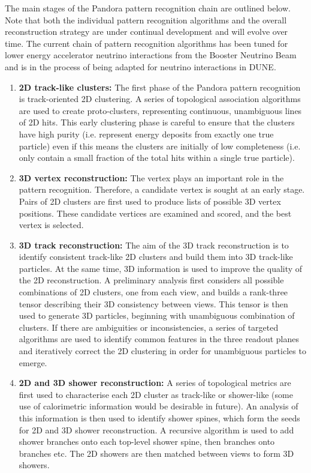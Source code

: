 The main stages of the Pandora pattern recognition chain are outlined below. Note that both the individual pattern recognition algorithms and the overall reconstruction strategy are under continual development and will evolve over time. The current chain of pattern recognition algorithms has been tuned for lower energy accelerator neutrino interactions from the Booster Neutrino Beam and is in the process of being adapted for neutrino interactions in DUNE.


\begin{enumerate}
\item{\bf 2D track-like clusters:}  The first phase of the Pandora pattern recognition is track-oriented 2D clustering. A series of topological association algorithms are used to create proto-clusters, representing continuous, unambiguous lines of 2D hits. This early clustering phase is careful to ensure that the clusters have high purity (i.e. represent energy deposits from exactly one true particle) even if this means the clusters are initially of low completeness (i.e. only contain a small fraction of the total hits within a single true particle).
\item{\bf 3D vertex reconstruction:} The vertex plays an important role in the pattern recognition. Therefore, a candidate vertex is sought at an early stage. Pairs of 2D clusters are first used to produce lists of possible 3D vertex positions. These candidate vertices are examined and scored, and the best vertex is selected.
\item{\bf 3D track reconstruction:} The aim of the 3D track reconstruction is to identify consistent track-like 2D clusters and build them into 3D track-like particles. At the same time, 3D information is used to improve the quality of the 2D reconstruction. A preliminary analysis first considers all possible combinations of 2D clusters, one from each view, and builds a rank-three tensor describing their 3D consistency between views. This tensor is then used to generate 3D particles, beginning with unambiguous combination of clusters. If there are ambiguities or inconsistencies, a series of targeted algorithms are used to identify common features in the three readout planes and iteratively correct the 2D clustering in order for unambiguous particles to emerge.
\item{\bf 2D and 3D shower reconstruction:} A series of topological metrics are first used to characterise each 2D cluster as track-like or shower-like (some use of calorimetric information would be desirable in future). An analysis of this information is then used to identify shower spines, which form the seeds for 2D and 3D shower reconstruction. A recursive algorithm is used to add shower branches onto each top-level shower spine, then branches onto branches etc. The 2D showers are then matched between views to form 3D showers.

\end{enumerate}
